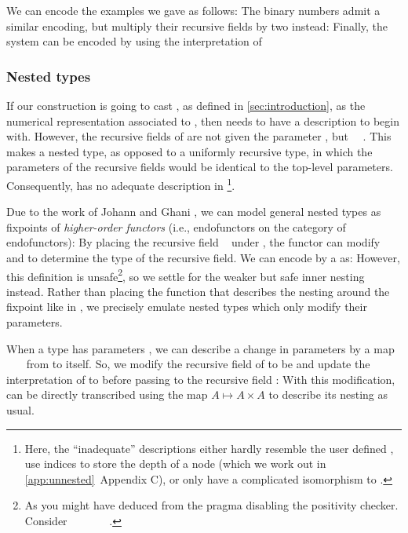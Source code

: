 We can encode the examples we gave as follows:
The binary numbers admit a similar encoding, but multiply their recursive fields by two instead:
Finally, the  system can be encoded by using the interpretation of 


\subsubsection{Nested types}
If our construction is going to cast , as defined in \autoref{sec:introduction}, as the numerical representation associated to , then  needs to have a description to begin with. However, the recursive fields of  are not given the parameter , but \ \ . This makes  a nested type, as opposed to a uniformly recursive type, in which the parameters of the recursive fields would be identical to the top-level parameters. Consequently,  has no adequate description in \footnote{Here, the ``inadequate'' descriptions either hardly resemble the user defined , use indices to store the depth of a node (which we work out in \ref{app:unnested}~Appendix C), or only have a complicated isomorphism to .}. 

Due to the work of Johann and Ghani \cite{initenough}, we can model general nested types as fixpoints of \emph{higher-order functors} (i.e., endofunctors on the category of endofunctors):
By placing the recursive field \  under , the functor  can modify \  and  to determine the type of the recursive field. We can encode  by a  as:
However, this definition is unsafe\footnote{As you might have deduced from the pragma disabling the positivity checker. Consider \ \ \ \AV{=}\ \ \ \ .}, so we settle for the weaker but safe inner nesting instead. Rather than placing the function that describes the nesting around the fixpoint like in , we precisely emulate nested types which only modify their parameters.

When a type has parameters , we can describe a change in parameters by a map \ \ \  from  to itself. So, we modify the recursive field  of  to be
and update the interpretation of  to  before passing  to the recursive field :
With this modification,  can be directly transcribed 
using the map $A \mapsto A \times A$ to describe its nesting as usual.

